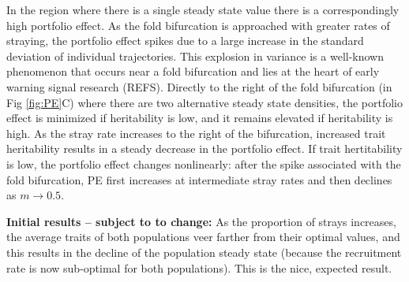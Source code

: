 \documentclass[onecolumn,preprintnumbers,amsmath,amssymb,superscriptaddress]{revtex4}
\begin{document}
In the region where there is a single steady state value there is a correspondingly high portfolio effect.
As the fold bifurcation is approached with greater rates of straying, the portfolio effect spikes due to a large increase in the standard deviation of individual trajectories.
This explosion in variance is a well-known phenomenon that occurs near a fold bifurcation and lies at the heart of early warning signal research (REFS).
Directly to the right of the fold bifurcation (in Fig \ref{fig:PE}C) where there are two alternative steady state densities, the portfolio effect is minimized if heritability is low, and it remains elevated if heritability is high.
As the stray rate increases to the right of the bifurcation, increased trait heritability results in a steady decrease in the portfolio effect.
If trait hertitability is low, the portfolio effect changes nonlinearly: after the spike associated with the fold bifurcation, {\rm PE} first increases at intermediate stray rates and then declines as $m\rightarrow0.5$. 












{\bf Initial results -- subject to to change:} As the proportion of strays increases, the average traits of both populations veer farther from their optimal values, and this results in the decline of the population steady state (because the recruitment rate is now sub-optimal for both populations). This is the nice, expected result.
\end{document}
